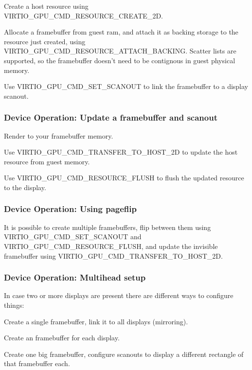 \begin{itemize*}
\item Create a host resource using VIRTIO_GPU_CMD_RESOURCE_CREATE_2D.
\item Allocate a framebuffer from guest ram, and attach it as backing
  storage to the resource just created, using
  VIRTIO_GPU_CMD_RESOURCE_ATTACH_BACKING.  Scatter lists are
  supported, so the framebuffer doesn't need to be contignous in guest
  physical memory.
\item Use VIRTIO_GPU_CMD_SET_SCANOUT to link the framebuffer to
  a display scanout.
\end{itemize*}

\subsubsection{Device Operation: Update a framebuffer and scanout}

\begin{itemize*}
\item Render to your framebuffer memory.
\item Use VIRTIO_GPU_CMD_TRANSFER_TO_HOST_2D to update the host resource
  from guest memory.
\item Use VIRTIO_GPU_CMD_RESOURCE_FLUSH to flush the updated resource
  to the display.
\end{itemize*}

\subsubsection{Device Operation: Using pageflip}

It is possible to create multiple framebuffers, flip between them
using VIRTIO_GPU_CMD_SET_SCANOUT and VIRTIO_GPU_CMD_RESOURCE_FLUSH,
and update the invisible framebuffer using
VIRTIO_GPU_CMD_TRANSFER_TO_HOST_2D.

\subsubsection{Device Operation: Multihead setup}

In case two or more displays are present there are different ways to
configure things:

\begin{itemize*}
\item Create a single framebuffer, link it to all displays
  (mirroring).
\item Create an framebuffer for each display.
\item Create one big framebuffer, configure scanouts to display a
  different rectangle of that framebuffer each.
\end{itemize*}

